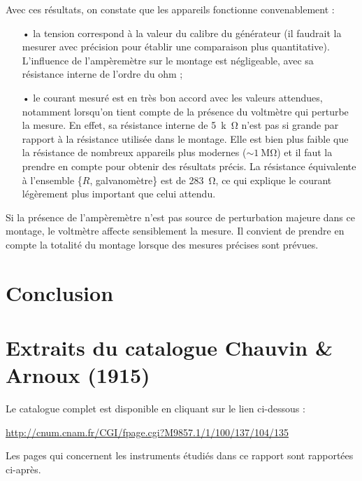 \documentclass[12pt,a4paper,fleqn]{article}
\begin{document}
Avec ces résultats, on constate que les appareils fonctionne convenablement : 
\begin{itemize}
\item[•] la tension correspond à la valeur du calibre du générateur (il faudrait la mesurer avec précision pour établir une comparaison plus quantitative).
L'influence de l'ampèremètre sur le montage est négligeable, avec sa résistance interne de l'ordre du ohm ;
\item[•] le courant mesuré est en très bon accord avec les valeurs attendues, notamment lorsqu'on tient compte de la présence du voltmètre qui perturbe la mesure.
En effet, sa résistance interne de \qty{5}{k\ohm} n'est pas si grande par rapport à la résistance utilisée dans le montage.
Elle est bien plus faible que la résistance de nombreux appareils plus modernes ($\sim\qty{1}{\mega\ohm}$) et il faut la prendre en compte pour obtenir des résultats précis.
La résistance équivalente à l'ensemble \{$R$, galvanomètre\} est de \qty{283}{\ohm}, ce qui explique le courant légèrement plus important que celui attendu.
\end{itemize}
Si la présence de l'ampèremètre n'est pas source de perturbation majeure dans ce montage, le voltmètre affecte sensiblement la mesure.
Il convient de prendre en compte la totalité du montage lorsque des mesures précises sont prévues.






\section*{Conclusion}

\newpage
\appendix



\newpage
\appendix


\section{Extraits du catalogue Chauvin \& Arnoux (1915)}
\label{ann:catalogue}

Le catalogue complet est disponible en cliquant sur le lien ci-dessous :

\noindent
\href{http://cnum.cnam.fr/CGI/fpage.cgi?M9857.1/1/100/137/104/135}{http://cnum.cnam.fr/CGI/fpage.cgi?M9857.1/1/100/137/104/135}

Les pages qui concernent les instruments étudiés dans ce rapport sont rapportées ci-après.


\end{document}

